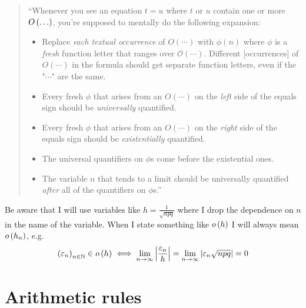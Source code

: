 \begin{quote}
  ``Whenever you see an equation $t=u$ where $t$ or $u$ contain one or more $O\left( {\ldots} \right)$, you're supposed to mentally do the following expansion:
  \begin{itemize}
    \item Replace \emph{each textual occurrence} of $O(\cdots)$ with $\phi(n)$ where $\phi$ is a \emph{fresh} function letter that ranges over $\mathcal O(\cdots)$. Different [occurrences] of $O(\cdots)$ in the formula should get separate function letters, even if the "$\cdots$" are the same.
    \item Every fresh $\phi$ that arises from an $O(\cdots)$ on the \emph{left} side of the equals sign should be \emph{universally} quantified.
    \item Every fresh $\phi$ that arises from an $O(\cdots)$ on the \emph{right} side of the equals sign should be \emph{existentially} quantified.
    \item The universal quantifiers on $\phi$s come before the existential ones.
    \item The variable $n$ that tends to a limit should be universally quantified \emph{after} all of the quantifiers on $\phi$s.''
  \end{itemize}
\end{quote}

\begin{remark}
  Be aware that I will use variables like $h=\frac{1}{\sqrt{npq}}$ where I drop the dependence on $n$ in the name of the variable. When I state something like $o\left( {h} \right)$ I will always mean $o\left( {h_n} \right)$, e.g.
  \begin{align}
    \left({\varepsilon_n}\right)_{{n}\in\mathbb N} \in o\left( {h} \right) \iff \lim_{n\to\infty} \left|{\frac{\varepsilon_n}{h}}\right| = \lim_{n\to\infty} \left|{\varepsilon_n \sqrt{npq}}\right| = 0
  \end{align}
\end{remark}

\section{Arithmetic rules}

